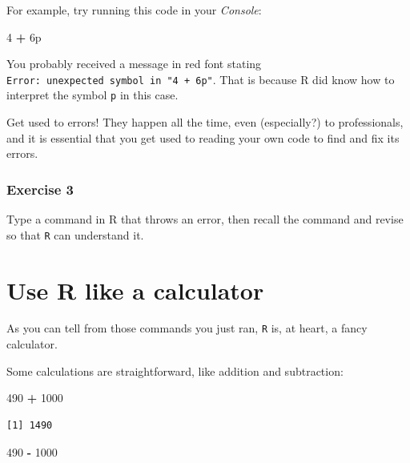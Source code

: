 \documentclass[
]{book}
\newenvironment{Shaded}{\begin{snugshade}}{\end{snugshade}}
\newcommand{\DecValTok}[1]{\textcolor[rgb]{0.00,0.00,0.81}{#1}}
\newcommand{\NormalTok}[1]{#1}
\newcommand{\OperatorTok}[1]{\textcolor[rgb]{0.81,0.36,0.00}{\textbf{#1}}}
\newcommand{\StringTok}[1]{\textcolor[rgb]{0.31,0.60,0.02}{#1}}
\begin{document}
For example, try running this code in your \emph{Console}:

\begin{Shaded}
\begin{Highlighting}[]
\DecValTok{4} \OperatorTok{+}\StringTok{ }\NormalTok{6p}
\end{Highlighting}
\end{Shaded}

You probably received a message in red font stating \texttt{Error:\ unexpected\ symbol\ in\ "4\ +\ 6p"}. That is because R did know how to interpret the symbol \texttt{p} in this case.

Get used to errors! They happen all the time, even (especially?) to professionals, and it is essential that you get used to reading your own code to find and fix its errors.

\hypertarget{exercise-3}{%
\subsubsection*{Exercise 3}\label{exercise-3}}

Type a command in R that throws an error, then recall the command and revise so that \texttt{R} can understand it.

\hypertarget{use-r-like-a-calculator}{%
\section*{Use R like a calculator}\label{use-r-like-a-calculator}}

As you can tell from those commands you just ran, \texttt{R} is, at heart, a fancy calculator.

Some calculations are straightforward, like addition and subtraction:

\begin{Shaded}
\begin{Highlighting}[]
\DecValTok{490} \OperatorTok{+}\StringTok{ }\DecValTok{1000}
\end{Highlighting}
\end{Shaded}

\begin{verbatim}
[1] 1490
\end{verbatim}

\begin{Shaded}
\begin{Highlighting}[]
\DecValTok{490} \OperatorTok{-}\StringTok{ }\DecValTok{1000}
\end{Highlighting}
\end{Shaded}
\end{document}
